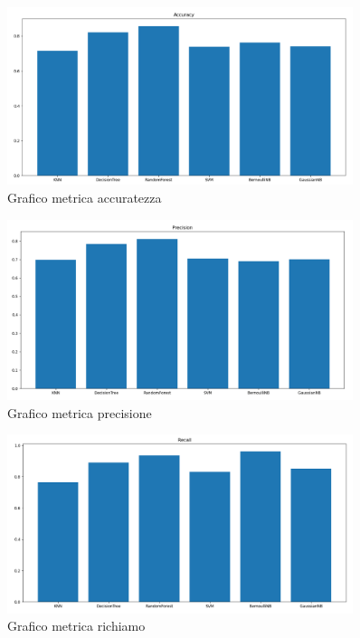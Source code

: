 \documentclass{article}
\begin{document}
\begin{figure}[H]
        \includegraphics[width=0.9\textwidth]{Accuracy}
        \centering
        \caption{Grafico metrica accuratezza}
        \centering
\end{figure}

\begin{figure}[H]
        \includegraphics[width=0.9\textwidth]{Precision}
        \centering
        \caption{Grafico metrica precisione}
        \centering
\end{figure}

\begin{figure}[H]
        \includegraphics[width=0.9\textwidth]{Recall}
        \centering
        \caption{Grafico metrica richiamo}
        \centering
\end{figure}
\end{document}
